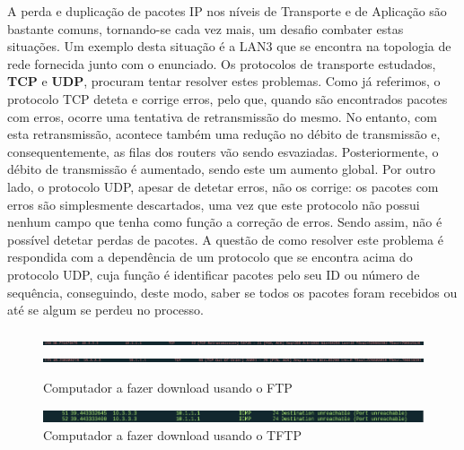 \documentclass[11pt]{article}
\begin{document}
\vspace{0.5cm}

A perda e duplicação de pacotes IP nos níveis de Transporte e de Aplicação são bastante comuns, tornando-se cada vez mais, um desafio combater estas situações. Um exemplo desta situação é a LAN3 que se encontra na topologia de rede fornecida junto com o enunciado. Os protocolos de transporte estudados, \textbf{TCP} e \textbf{UDP}, procuram tentar resolver estes problemas.
Como já referimos, o protocolo TCP deteta e corrige erros, pelo que, quando são encontrados pacotes com erros, ocorre uma tentativa de retransmissão do mesmo. No entanto, com esta retransmissão, acontece também uma redução no débito de transmissão e, consequentemente, as filas dos routers vão sendo esvaziadas. Posteriormente, o débito de transmissão é aumentado, sendo este um aumento global.
Por outro lado, o protocolo UDP, apesar de detetar erros, não os corrige: os pacotes com erros são simplesmente descartados, uma vez que este protocolo não possui nenhum campo que tenha como função a correção de erros. Sendo assim, não é possível detetar perdas de pacotes. A questão de como resolver este problema é respondida com a dependência de um protocolo que se encontra acima do protocolo UDP, cuja função é identificar pacotes pelo seu ID ou número de sequência, conseguindo, deste modo, saber se todos os pacotes foram recebidos ou até se algum se perdeu no processo.

\begin{figure}[hbt!]
    \centering
    \includegraphics[width=1\textwidth]{images/Q4/erroftp.PNG}
    \includegraphics[width=1\textwidth]{images/Q4/erroftp2.PNG}
    \caption{Computador a fazer download usando o FTP}
    \label{fig:my_label}
\end{figure}

\begin{figure}[hbt!]
    \centering
    \includegraphics[width=1\textwidth]{images/Q4/tftp erro.PNG}
    \caption{Computador a fazer download usando o TFTP}
    \label{fig:my_label}
\end{figure}
\end{document}
